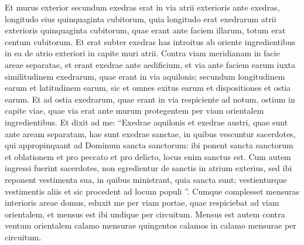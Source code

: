 \begin{biblechapter}
\begin{biblechapter}
\begin{biblechapter}
\begin{biblechapter}
\begin{biblechapter}
\begin{biblechapter}
\begin{biblechapter}
\begin{biblechapter}
\begin{biblechapter}
\begin{biblechapter}
\begin{biblechapter}
\begin{biblechapter}
\begin{biblechapter}
\begin{biblechapter}
\begin{biblechapter}
\begin{biblechapter}
\begin{biblechapter}
\begin{biblechapter}
\begin{biblechapter}
\begin{biblechapter}
\begin{biblechapter}
\begin{biblechapter}
\begin{biblechapter}
\begin{biblechapter}
\begin{biblechapter}
\begin{biblechapter}
\begin{biblechapter}
\begin{biblechapter}
\begin{biblechapter}
\begin{biblechapter}
\begin{biblechapter}
\begin{biblechapter}
\begin{biblechapter}
\begin{biblechapter}
\begin{biblechapter}
\begin{biblechapter}
\begin{biblechapter}
\begin{biblechapter}
\begin{biblechapter}
\begin{biblechapter}
\begin{biblechapter}
\begin{biblechapter}
\verse Et murus exterior secundum exedras erat in via atrii exterioris ante exedras, longitudo eius quinquaginta cubitorum, 
\verse quia longitudo erat exedrarum atrii exterioris quinquaginta cubitorum, quae erant ante faciem illarum, totum erat centum cubitorum. 
\verse Et erat subter exedras has introitus ab oriente ingredientibus in ea de atrio exteriori 
\verse in capite muri atrii. Contra viam meridianam in facie areae separatae, et erant exedrae ante aedificium, 
\verse et via ante faciem earum iuxta similitudinem exedrarum, quae erant in via aquilonis; secundum longitudinem earum et latitudinem earum, sic et omnes exitus earum et dispositiones et ostia earum. 
\verse Et ad ostia exedrarum, quae erant in via respiciente ad notum, ostium in capite viae, quae via erat ante murum protegentem per viam orientalem ingredientibus. 
\verse Et dixit ad me: “Exedrae aquilonis et exedrae austri, quae sunt ante aream separatam, hae sunt exedrae sanctae, in quibus vescuntur sacerdotes, qui appropinquant ad Dominum sancta sanctorum: ibi ponent sancta sanctorum et oblationem et pro peccato et pro delicto, locus enim sanctus est. 
\verse Cum autem ingressi fuerint sacerdotes, non egredientur de sanctis in atrium exterius, sed ibi reponent vestimenta sua, in quibus ministrant, quia sancta sunt; vestienturque vestimentis aliis et sic procedent ad locum populi ”.
 \verse Cumque complesset mensuras interioris areae domus, eduxit me per viam portae, quae respiciebat ad viam orientalem, et mensus est ibi undique per circuitum. 
 \verse Mensus est autem contra ventum orientalem calamo mensurae quingentos calamos in calamo mensurae per circuitum. 

\end{biblechapter}
\end{biblechapter}
\end{biblechapter}
\end{biblechapter}
\end{biblechapter}
\end{biblechapter}
\end{biblechapter}
\end{biblechapter}
\end{biblechapter}
\end{biblechapter}
\end{biblechapter}
\end{biblechapter}
\end{biblechapter}
\end{biblechapter}
\end{biblechapter}
\end{biblechapter}
\end{biblechapter}
\end{biblechapter}
\end{biblechapter}
\end{biblechapter}
\end{biblechapter}
\end{biblechapter}
\end{biblechapter}
\end{biblechapter}
\end{biblechapter}
\end{biblechapter}
\end{biblechapter}
\end{biblechapter}
\end{biblechapter}
\end{biblechapter}
\end{biblechapter}
\end{biblechapter}
\end{biblechapter}
\end{biblechapter}
\end{biblechapter}
\end{biblechapter}
\end{biblechapter}
\end{biblechapter}
\end{biblechapter}
\end{biblechapter}
\end{biblechapter}
\end{biblechapter}
